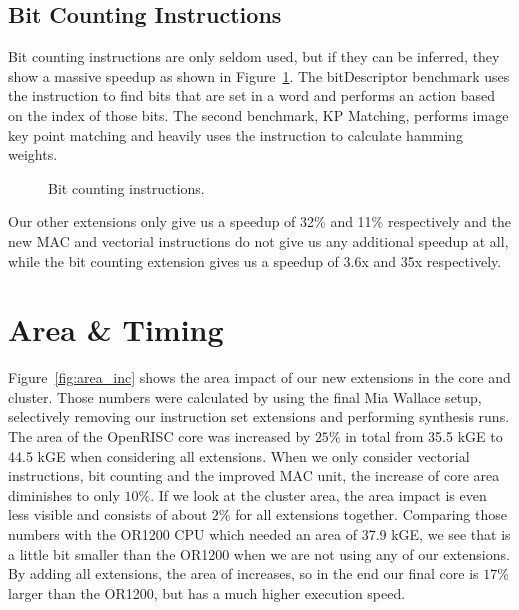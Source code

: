 \clearpage

\subsection{Bit Counting Instructions}

Bit counting instructions are only seldom used, but if they can be inferred,
they show a massive speedup as shown in Figure~\ref{fig:bit_count_cpu_comp}. The
bitDescriptor benchmark uses the  instruction to find bits that are set
in a word and performs an action based on the index of those bits. The second
benchmark, KP Matching, performs image key point matching and heavily uses the
 instruction to calculate hamming weights.

\begin{figure}[htbp]
  \centering
  
  \caption{Bit counting instructions.}
  \label{fig:bit_count_cpu_comp}
\end{figure}

Our other extensions only give us a speedup of 32\% and 11\% respectively and
the new MAC and vectorial instructions do not give us any additional speedup at
all, while the bit counting extension gives us a speedup of 3.6x and 35x
respectively.



\section{Area \& Timing}
\label{sec:res_area}

Figure~\ref{fig:area_inc} shows the area impact of our new extensions in the
core and cluster. Those numbers were calculated by using the final Mia Wallace
setup, selectively removing our instruction set extensions and performing
synthesis runs.
The area of the OpenRISC core was increased by $25\%$ in total from 35.5 kGE to
44.5 kGE when considering all extensions. When we only consider vectorial
instructions, bit counting and the improved MAC unit, the increase of core area
diminishes to only $10\%$.
If we look at the cluster area, the area impact is even less visible and
consists of about $2\%$ for all extensions together.
Comparing those numbers with the OR1200 CPU which needed an area of 37.9 kGE, we
see that \orion is a little bit smaller than the OR1200 when we are not using
any of our extensions. By adding all extensions, the area of \orion increases,
so in the end our final \orion core is $17\%$ larger than the OR1200, but has a
much higher execution speed.

